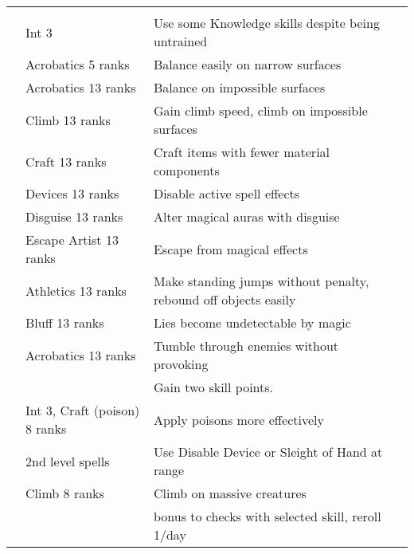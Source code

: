 {\begin{longtabu}{>{\lcol}p{10em} >{\lcol}p{15em} >{\lcol}X >{\lcol}p{3em}}
    \midrule
     &  &  &  \\
     & Int 3 & Use some Knowledge skills despite being untrained &  \\
     & Acrobatics 5 ranks & Balance easily on narrow surfaces &  \\
     & Acrobatics 13 ranks & Balance on impossible surfaces &  \\
     & Climb 13 ranks & Gain climb speed, climb on impossible surfaces &  \\
     & Craft 13 ranks & Craft items with fewer material components &  \\
     & Devices 13 ranks & Disable active spell effects &  \\
     & Disguise 13 ranks & Alter magical auras with disguise &  \\
     & Escape Artist 13 ranks & Escape from magical effects &  \\
     & Athletics 13 ranks & Make standing jumps without penalty, rebound off objects easily &  \\
     & Bluff 13 ranks & Lies become undetectable by magic &  \\
     & Acrobatics 13 ranks & Tumble through enemies without provoking &  \\
     & \x & Gain two skill points. &  \\
     & Int 3, Craft (poison) 8 ranks & Apply poisons more effectively &  \\
     &  2nd level spells & Use Disable Device or Sleight of Hand at range &  \\
     & Climb 8 ranks & Climb on massive creatures &  \\
     & \x &   bonus to checks with selected skill, reroll 1/day &  \\

\end{longtabu}}
